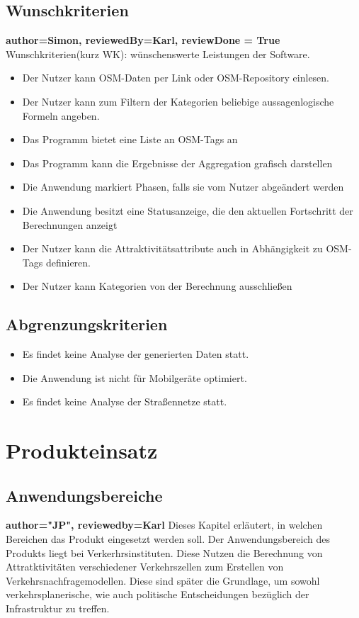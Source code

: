 \documentclass[parskip=full]{scrartcl} %
\begin{document}
\subsection{Wunschkriterien}
\textbf{author=Simon, reviewedBy=Karl, reviewDone = True\\}
Wunschkriterien(kurz WK): wünschenswerte Leistungen der Software.
\begin{itemize}
    \item <WK1> Der Nutzer kann OSM-Daten per Link oder OSM-Repository einlesen.
    \item <WK2> Der Nutzer kann zum Filtern der Kategorien beliebige aussagenlogische Formeln angeben.
    \item <WK3> Das Programm bietet eine Liste an OSM-Tags an
    \item <WK4> Das Programm kann die Ergebnisse der Aggregation grafisch darstellen
    \item <WK5> Die Anwendung markiert Phasen, falls sie vom Nutzer abgeändert werden
    \item <WK6> Die Anwendung besitzt eine Statusanzeige, die den aktuellen Fortschritt der Berechnungen anzeigt
    \item <WK7> Der Nutzer kann die Attraktivitätsattribute auch in Abhängigkeit zu OSM-Tags definieren.
    \item <WK8> Der Nutzer kann Kategorien von der Berechnung ausschließen
    
\end{itemize}

\subsection{Abgrenzungskriterien}
\begin{itemize}
    \item Es findet keine Analyse der generierten Daten statt.
    \item Die Anwendung ist nicht für Mobilgeräte optimiert.
    \item Es findet keine Analyse der Straßennetze statt.
\end{itemize}
\newpage

\section{Produkteinsatz}

\subsection{Anwendungsbereiche}
\textbf{author="JP", reviewedby=Karl} 
Dieses Kapitel erläutert, in welchen Bereichen das Produkt eingesetzt werden soll. Der Anwendungsbereich des Produkts liegt bei Verkerhrsinstituten. Diese Nutzen die Berechnung von Attratktivitäten verschiedener Verkehrszellen zum Erstellen von Verkehrsnachfragemodellen. Diese sind später die Grundlage, um sowohl verkehrsplanerische, wie auch politische Entscheidungen bezüglich der Infrastruktur zu treffen.
\end{document}
